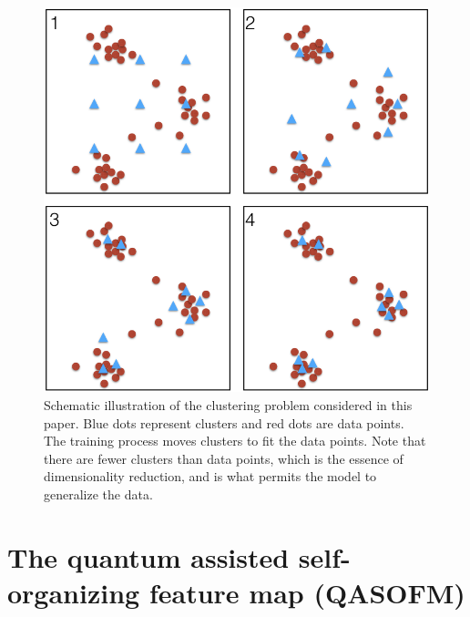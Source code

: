\documentclass[pra,showkeys,twocolumn,showpacs]{revtex4-1}
\begin{document}
\begin{figure}
  	\includegraphics[width=0.95\columnwidth]{sofm_fitting.png}
	\caption{
		Schematic illustration of the clustering problem considered in this paper.  
		Blue dots represent clusters and red dots are data points. 
		The training process moves clusters to fit the data points. 
		Note that there are fewer clusters than data points, 
		which is the essence of dimensionality reduction, 
		and is what permits the model to generalize the data.
	}
	\label{fig:sofm_fitting}
\end{figure}


























\section{The quantum assisted self-organizing feature map (QASOFM)}
\label{sec:qasofm}
\end{document}
